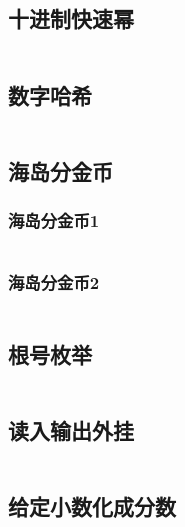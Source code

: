 \documentclass{article}
\begin{document}
\subsection{十进制快速幂}
\inputminted[breaklines]{c++}{../其他/十进制快速幂.cpp}

\subsection{数字哈希}
\inputminted[breaklines]{c++}{../其他/数字哈希.cpp}

\subsection{海岛分金币}
\subsubsection{海岛分金币1}
\inputminted[breaklines]{c++}{../其他/海岛分金币1.cpp}

\subsubsection{海岛分金币2}
\inputminted[breaklines]{c++}{../其他/海岛分金币2.cpp}

\subsection{根号枚举}
\inputminted[breaklines]{c++}{../其他/根号枚举.cpp}

\subsection{读入输出外挂}
\inputminted[breaklines]{c++}{../其他/读入输出外挂.cpp}

\subsection{给定小数化成分数}
\inputminted[breaklines]{python}{../其他/给定小数化成分数.py}

\end{document}
